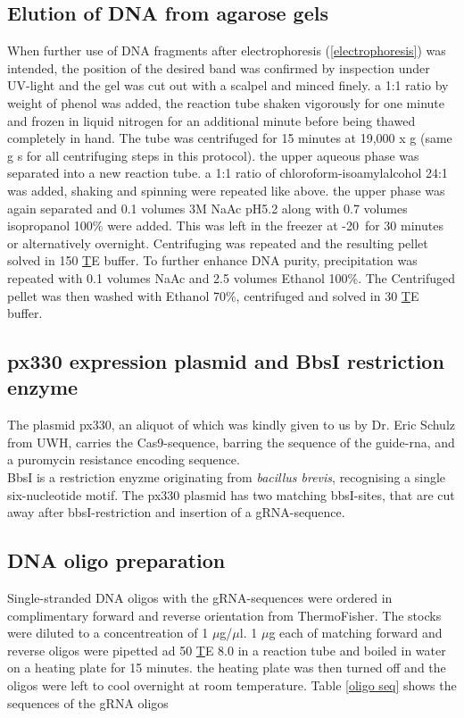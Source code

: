 \subsection{Elution of DNA from agarose gels}
\label{freezy-squeezy}
When further use of DNA fragments after electrophoresis (\ref{electrophoresis}) was intended, the position of the desired band was confirmed by inspection under UV-light and the gel was cut out with a scalpel and minced finely. a 1:1 ratio by weight of phenol was added, the reaction tube shaken vigorously for one minute and frozen in liquid nitrogen for an additional minute before being thawed completely in hand. The tube was centrifuged for 15 minutes at 19,000 x g (same g s for all centrifuging steps in this protocol). the upper aqueous phase was separated into a new reaction tube. a 1:1 ratio of chloroform-isoamylalcohol 24:1 was added, shaking and spinning were repeated like above. the upper phase was again separated and 0.1 volumes 3M NaAc pH5.2 along with 0.7 volumes isopropanol 100\% were added. This was left in the freezer at -20\C\ for 30 minutes or alternatively overnight. Centrifuging was repeated and the resulting pellet solved in 150 \ul TE buffer. To further enhance DNA purity, precipitation was repeated with 0.1 volumes NaAc and 2.5 volumes Ethanol 100\%. The Centrifuged pellet was then washed with Ethanol 70\%, centrifuged and solved in 30 \ul TE buffer.

\subsection{px330 expression plasmid and BbsI restriction enzyme}

The plasmid px330, an aliquot of which was kindly given to us by Dr. Eric Schulz from UWH, carries the Cas9-sequence, barring the sequence of the guide-rna, and a puromycin resistance encoding sequence. \\
BbsI is a restriction  enyzme originating from \textit{bacillus brevis}, recognising a single six-nucleotide motif. The px330 plasmid has two matching bbsI-sites, that are cut away after bbsI-restriction and insertion of a gRNA-sequence.

\subsection{DNA oligo preparation}
Single-stranded DNA oligos with the gRNA-sequences were ordered in complimentary forward and reverse orientation from ThermoFisher. The stocks were diluted to a concentreation of 1 \(\mu\)g/\(\mu\)l. 1 \(\mu\)g each of  matching forward and reverse oligos were pipetted ad 50 \ul TE 8.0 in a reaction tube and boiled in  water on a heating plate for 15 minutes. the heating plate was then turned off and the oligos were left to cool overnight at room temperature. Table \ref{oligo seq} shows the sequences of the gRNA oligos

